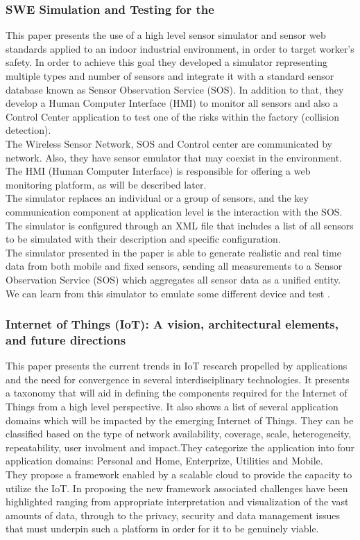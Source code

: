 \subsubsection{SWE Simulation and Testing for the \IoT}\cite{Paper3}
This paper presents the use of a high level sensor simulator and sensor web standards applied to an indoor industrial environment, in order to target worker's safety. In order to achieve this goal they developed a simulator representing multiple types and number of sensors and integrate it with a standard sensor database known as Sensor Observation Service (SOS). In addition to that, they develop a Human Computer Interface (HMI) to monitor all sensors and also a Control Center application to test one of the risks within the factory (collision detection).\\
The Wireless Sensor Network, SOS and Control center are communicated by network. Also, they have sensor emulator that may coexist in the environment. The HMI (Human Computer Interface) is responsible for offering a web monitoring platform, as will be described later.\\
The simulator replaces an individual or a group of sensors, and the key communication component at application level is the interaction with the SOS. \\
The simulator is configured through an XML file that includes a list of all sensors to be simulated with their description and specific configuration.\\
The simulator presented in the paper is able to generate realistic and real time data from both mobile and fixed sensors, sending all measurements to a Sensor Observation Service (SOS) which aggregates all sensor data as a unified entity. \\
We can learn from this simulator to emulate some different device and test \IoT.\\

\subsubsection{Internet of Things (IoT): A vision, architectural elements, and future directions}\cite{Paper9}
This paper presents the current trends in IoT research propelled by applications and the need for convergence in several interdisciplinary technologies. It presents a taxonomy that will aid in defining the components required for the Internet of Things from a high level perspective. It also shows a list of several application domains which will be impacted by the emerging Internet of Things. They can be classified based on the type of network availability, coverage, scale, heterogeneity, repeatability, user involment and impact.They categorize the application into four application domains: Personal and Home, Enterprize, Utilities and Mobile.\\
They propose a framework enabled by a scalable cloud to provide the capacity to utilize the IoT. In proposing the new framework associated challenges have been highlighted ranging from appropriate interpretation and visualization of the vast amounts of data, through to the privacy, security and data management issues that must underpin such a platform in order for it to be genuinely viable.

